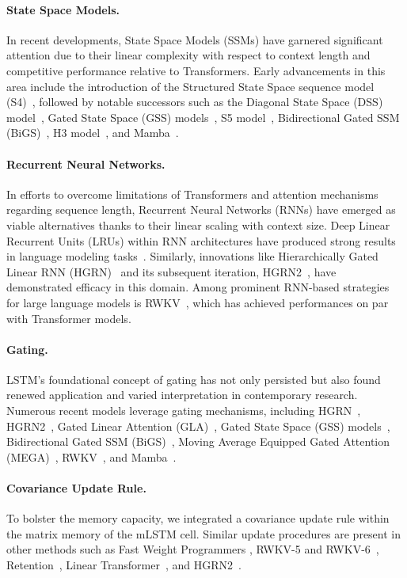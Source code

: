 \paragraph{State Space Models.} In recent developments, State Space Models (SSMs) have garnered significant attention due to their linear complexity with respect to context length and competitive performance relative to Transformers. Early advancements in this area include the introduction of the Structured State Space sequence model (S4)~\citep{Gu:21}, followed by notable successors such as the Diagonal State Space (DSS) model~\citep{Gupta:22}, Gated State Space (GSS) models~\citep{Mehta:22}, S5 model~\citep{Smith:22}, Bidirectional Gated SSM (BiGS)~\citep{Wang:22}, H3 model~\citep{Fu:23}, and Mamba~\citep{Gu:24arxiv}.

\paragraph{Recurrent Neural Networks.} In efforts to overcome limitations of Transformers and attention mechanisms regarding sequence length, Recurrent Neural Networks (RNNs) have emerged as viable alternatives thanks to their linear scaling with context size. Deep Linear Recurrent Units (LRUs) within RNN architectures have produced strong results in language modeling tasks~\citep{Orvieto:23, De:24arxiv}. Similarly, innovations like Hierarchically Gated Linear RNN (HGRN)~\citep{Qin:23} and its subsequent iteration, HGRN2~\citep{Qin:24arxiv}, have demonstrated efficacy in this domain. Among prominent RNN-based strategies for large language models is RWKV~\citep{Peng:23arxivshort, Peng:24arxivshort}, which has achieved performances on par with Transformer models.

\paragraph{Gating.}
LSTM’s foundational concept of gating has not only persisted but also found renewed application and varied interpretation in contemporary research. Numerous recent models leverage gating mechanisms, including HGRN~\citep{Qin:23}, HGRN2~\citep{Qin:24arxiv}, Gated Linear Attention (GLA)~\citep{Yang:23arxiv}, Gated State Space (GSS) models~\citep{Mehta:22}, Bidirectional Gated SSM (BiGS)~\citep{Wang:22}, Moving Average Equipped Gated Attention (MEGA)~\citep{Ma:22}, RWKV~\citep{Peng:23arxivshort}, and Mamba~\citep{Gu:24arxiv}.

\paragraph{Covariance Update Rule.} 
To bolster the memory capacity, we integrated a covariance update rule within the matrix memory of the mLSTM cell. Similar update procedures are present in other methods such as Fast Weight Programmers \citep{Schmidhuber:92ncfastweights,Schlag:21}, RWKV-5 and RWKV-6~\citep{Peng:24arxivshort}, Retention~\citep{Sun:23arxiv}, Linear Transformer~\citep{Katharopoulos:20}, and HGRN2~\citep{Qin:24arxiv}.

